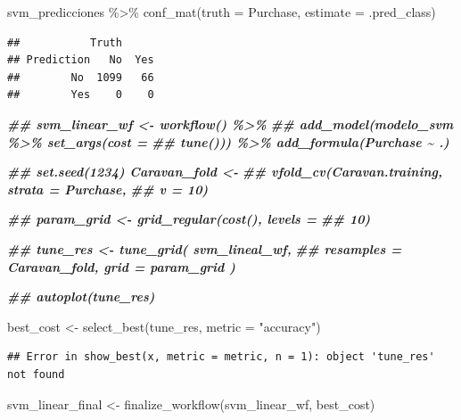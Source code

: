 \documentclass[
  12pt,
]{book}
\newenvironment{Shaded}{\begin{snugshade}}{\end{snugshade}}
\newcommand{\AttributeTok}[1]{\textcolor[rgb]{0.77,0.63,0.00}{#1}}
\newcommand{\DocumentationTok}[1]{\textcolor[rgb]{0.56,0.35,0.01}{\textbf{\textit{#1}}}}
\newcommand{\FunctionTok}[1]{\textcolor[rgb]{0.00,0.00,0.00}{#1}}
\newcommand{\NormalTok}[1]{#1}
\newcommand{\OtherTok}[1]{\textcolor[rgb]{0.56,0.35,0.01}{#1}}
\newcommand{\SpecialCharTok}[1]{\textcolor[rgb]{0.00,0.00,0.00}{#1}}
\newcommand{\StringTok}[1]{\textcolor[rgb]{0.31,0.60,0.02}{#1}}
\begin{document}
\begin{Shaded}
\begin{Highlighting}[]
\NormalTok{svm\_predicciones }\SpecialCharTok{\%\textgreater{}\%}
    \FunctionTok{conf\_mat}\NormalTok{(}\AttributeTok{truth =}\NormalTok{ Purchase, }\AttributeTok{estimate =}\NormalTok{ .pred\_class)}
\end{Highlighting}
\end{Shaded}

\begin{verbatim}
##           Truth
## Prediction   No  Yes
##        No  1099   66
##        Yes    0    0
\end{verbatim}

\begin{Shaded}
\begin{Highlighting}[]
\DocumentationTok{\#\# svm\_linear\_wf \textless{}{-} workflow() \%\textgreater{}\%}
\DocumentationTok{\#\# add\_model(modelo\_svm \%\textgreater{}\% set\_args(cost =}
\DocumentationTok{\#\# tune())) \%\textgreater{}\% add\_formula(Purchase \textasciitilde{} .)}

\DocumentationTok{\#\# set.seed(1234) Caravan\_fold \textless{}{-}}
\DocumentationTok{\#\# vfold\_cv(Caravan.training, strata = Purchase,}
\DocumentationTok{\#\# v = 10)}

\DocumentationTok{\#\# param\_grid \textless{}{-} grid\_regular(cost(), levels =}
\DocumentationTok{\#\# 10)}

\DocumentationTok{\#\# tune\_res \textless{}{-} tune\_grid( svm\_lineal\_wf,}
\DocumentationTok{\#\# resamples = Caravan\_fold, grid = param\_grid )}

\DocumentationTok{\#\# autoplot(tune\_res)}
\end{Highlighting}
\end{Shaded}

\begin{Shaded}
\begin{Highlighting}[]
\NormalTok{best\_cost }\OtherTok{\textless{}{-}} \FunctionTok{select\_best}\NormalTok{(tune\_res, }\AttributeTok{metric =} \StringTok{"accuracy"}\NormalTok{)}
\end{Highlighting}
\end{Shaded}

\begin{verbatim}
## Error in show_best(x, metric = metric, n = 1): object 'tune_res' not found
\end{verbatim}

\begin{Shaded}
\begin{Highlighting}[]
\NormalTok{svm\_linear\_final }\OtherTok{\textless{}{-}} \FunctionTok{finalize\_workflow}\NormalTok{(svm\_linear\_wf,}
\NormalTok{    best\_cost)}
\end{Highlighting}
\end{Shaded}
\end{document}

